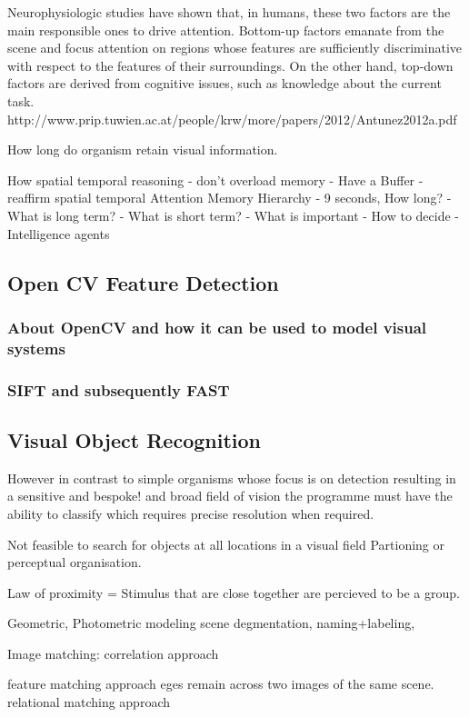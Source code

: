 \documentclass{mproj}
\begin{document}
Neurophysiologic studies have shown that, in humans, these two 
factors are the main responsible ones to drive attention. Bottom-up factors emanate from the scene and 
focus attention on regions whose features are sufficiently discriminative with respect to the features 
of their surroundings. On the other hand, top-down factors are derived from cognitive issues, such as 
knowledge about the current task.
http://www.prip.tuwien.ac.at/people/krw/more/papers/2012/Antunez2012a.pdf

How long do organism retain visual information.

How spatial temporal reasoning
- don't overload memory
- Have a Buffer
- reaffirm spatial temporal Attention
Memory Hierarchy
- 9 seconds, How long?
- What is long term?
- What is short term? 
- What is important
- How to decide
- Intelligence agents

\subsection{Open CV Feature Detection}
\subsubsection{About OpenCV and how it can be used to model visual systems}
\subsubsection{SIFT and subsequently FAST}

\subsection{Visual Object Recognition}

However in contrast to simple organisms whose focus is on detection resulting in a sensitive and bespoke! and broad field of vision the programme must have the ability to classify which requires precise resolution when required.

Not feasible to search for objects at all locations in a visual field
Partioning or perceptual organisation.

Law of proximity = Stimulus that are close together are percieved to be a group.

Geometric, Photometric modeling scene degmentation, naming+labeling,

Image matching:
correlation approach
 
feature matching approach
eges remain across two images of the same scene. 
relational matching approach
\end{document}
